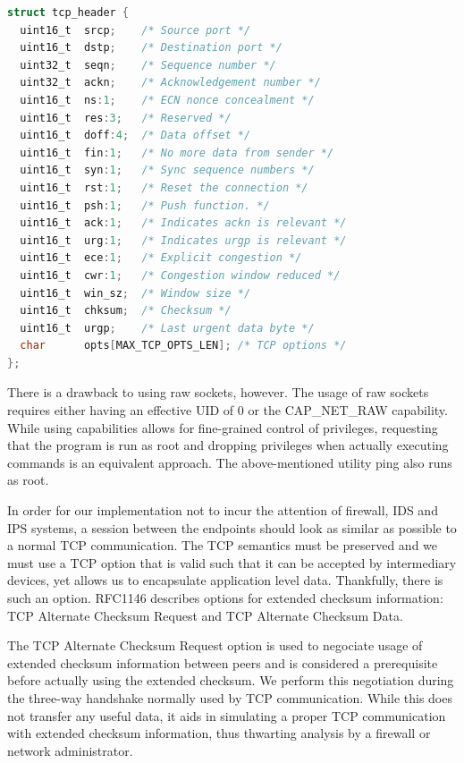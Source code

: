 \begin{lstlisting}[caption={Verbose TCP Header Structure},
                   label={lst:our-tcphdr},
                   basicstyle=\footnotesize,
                   captionpos=b,
                   frame=single,
                   language=C
                  ]
struct tcp_header {
  uint16_t  srcp;    /* Source port */
  uint16_t  dstp;    /* Destination port */
  uint32_t  seqn;    /* Sequence number */
  uint32_t  ackn;    /* Acknowledgement number */
  uint16_t  ns:1;    /* ECN nonce concealment */
  uint16_t  res:3;   /* Reserved */
  uint16_t  doff:4;  /* Data offset */
  uint16_t  fin:1;   /* No more data from sender */
  uint16_t  syn:1;   /* Sync sequence numbers */
  uint16_t  rst:1;   /* Reset the connection */
  uint16_t  psh:1;   /* Push function. */
  uint16_t  ack:1;   /* Indicates ackn is relevant */
  uint16_t  urg:1;   /* Indicates urgp is relevant */
  uint16_t  ece:1;   /* Explicit congestion */
  uint16_t  cwr:1;   /* Congestion window reduced */
  uint16_t  win_sz;  /* Window size */
  uint16_t  chksum;  /* Checksum */
  uint16_t  urgp;    /* Last urgent data byte */
  char      opts[MAX_TCP_OPTS_LEN]; /* TCP options */
};
\end{lstlisting}

There is a drawback to using raw sockets, however. The usage of raw sockets
requires either having an effective UID of 0 or the CAP_NET_RAW capability.
While using capabilities allows for fine-grained control of privileges, requesting
that the program is run as root and dropping privileges when actually executing
commands is an equivalent approach. The above-mentioned utility ping also
runs as root.

In order for our implementation not to incur the attention of firewall, IDS and
IPS systems, a session between the endpoints should look as similar as possible
to a normal TCP communication. The TCP semantics must be preserved and we must
use a TCP option that is valid such that it can be accepted by intermediary
devices, yet allows us to encapsulate application level data. Thankfully, there
is such an option. RFC1146 \cite{rfc1146} describes options for extended checksum
information: TCP Alternate Checksum Request and TCP Alternate Checksum Data.

The TCP Alternate Checksum Request option is used to negociate usage of extended
checksum information between peers and is considered a prerequisite before actually
using the extended checksum. We perform this negotiation during the three-way
handshake normally used by TCP communication. While this does not transfer any
useful data, it aids in simulating a proper TCP communication with extended
checksum information, thus thwarting analysis by a firewall or network administrator.

